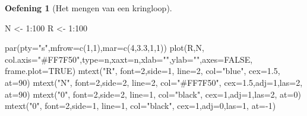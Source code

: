 \documentclass[
  a4paper,
]{scrbook}
\newenvironment{Shaded}{\begin{snugshade}}{\end{snugshade}}
\newcommand{\AttributeTok}[1]{\textcolor[rgb]{0.40,0.45,0.13}{#1}}
\newcommand{\ConstantTok}[1]{\textcolor[rgb]{0.56,0.35,0.01}{#1}}
\newcommand{\DecValTok}[1]{\textcolor[rgb]{0.68,0.00,0.00}{#1}}
\newcommand{\FloatTok}[1]{\textcolor[rgb]{0.68,0.00,0.00}{#1}}
\newcommand{\FunctionTok}[1]{\textcolor[rgb]{0.28,0.35,0.67}{#1}}
\newcommand{\NormalTok}[1]{\textcolor[rgb]{0.00,0.23,0.31}{#1}}
\newcommand{\OtherTok}[1]{\textcolor[rgb]{0.00,0.23,0.31}{#1}}
\newcommand{\SpecialCharTok}[1]{\textcolor[rgb]{0.37,0.37,0.37}{#1}}
\newcommand{\StringTok}[1]{\textcolor[rgb]{0.13,0.47,0.30}{#1}}
\theoremstyle{definition}
\newtheorem{exercise}{Oefening}[chapter]
\theoremstyle{remark}
\begin{document}
\begin{exercise}[Het mengen van een
kringloop]
\begin{Shaded}
\begin{Highlighting}[]
\NormalTok{N }\OtherTok{\textless{}{-}} \DecValTok{1}\SpecialCharTok{:}\DecValTok{100}
\NormalTok{R }\OtherTok{\textless{}{-}} \DecValTok{1}\SpecialCharTok{:}\DecValTok{100}

\FunctionTok{par}\NormalTok{(}\AttributeTok{pty=}\StringTok{"s"}\NormalTok{,}\AttributeTok{mfrow=}\FunctionTok{c}\NormalTok{(}\DecValTok{1}\NormalTok{,}\DecValTok{1}\NormalTok{),}\AttributeTok{mar=}\FunctionTok{c}\NormalTok{(}\DecValTok{4}\NormalTok{,}\FloatTok{3.3}\NormalTok{,}\DecValTok{1}\NormalTok{,}\DecValTok{1}\NormalTok{))}
\FunctionTok{plot}\NormalTok{(R,N,  }\AttributeTok{col.axis=}\StringTok{"\#FF7F50"}\NormalTok{,}\AttributeTok{type=}\StringTok{\textquotesingle{}n\textquotesingle{}}\NormalTok{,}\AttributeTok{xaxt=}\StringTok{\textquotesingle{}n\textquotesingle{}}\NormalTok{,}\AttributeTok{xlab=}\StringTok{""}\NormalTok{,}\AttributeTok{ylab=}\StringTok{""}\NormalTok{,}\AttributeTok{axes=}\ConstantTok{FALSE}\NormalTok{, }\AttributeTok{frame.plot=}\ConstantTok{TRUE}\NormalTok{)}
\FunctionTok{mtext}\NormalTok{(}\StringTok{"R"}\NormalTok{, }\AttributeTok{font=}\DecValTok{2}\NormalTok{,}\AttributeTok{side=}\DecValTok{1}\NormalTok{, }\AttributeTok{line=}\DecValTok{2}\NormalTok{, }\AttributeTok{col=}\StringTok{"blue"}\NormalTok{, }\AttributeTok{cex=}\FloatTok{1.5}\NormalTok{, }\AttributeTok{at=}\DecValTok{90}\NormalTok{)}
\FunctionTok{mtext}\NormalTok{(}\StringTok{"N"}\NormalTok{, }\AttributeTok{font=}\DecValTok{2}\NormalTok{,}\AttributeTok{side=}\DecValTok{2}\NormalTok{, }\AttributeTok{line=}\DecValTok{2}\NormalTok{, }\AttributeTok{col=}\StringTok{"\#FF7F50"}\NormalTok{, }\AttributeTok{cex=}\FloatTok{1.5}\NormalTok{,}\AttributeTok{adj=}\DecValTok{1}\NormalTok{,}\AttributeTok{las=}\DecValTok{2}\NormalTok{, }\AttributeTok{at=}\DecValTok{90}\NormalTok{)}
\FunctionTok{mtext}\NormalTok{(}\StringTok{"0"}\NormalTok{, }\AttributeTok{font=}\DecValTok{2}\NormalTok{,}\AttributeTok{side=}\DecValTok{2}\NormalTok{, }\AttributeTok{line=}\DecValTok{1}\NormalTok{, }\AttributeTok{col=}\StringTok{"black"}\NormalTok{, }\AttributeTok{cex=}\DecValTok{1}\NormalTok{,}\AttributeTok{adj=}\DecValTok{1}\NormalTok{,}\AttributeTok{las=}\DecValTok{2}\NormalTok{, }\AttributeTok{at=}\DecValTok{0}\NormalTok{)}
\FunctionTok{mtext}\NormalTok{(}\StringTok{"0"}\NormalTok{, }\AttributeTok{font=}\DecValTok{2}\NormalTok{,}\AttributeTok{side=}\DecValTok{1}\NormalTok{, }\AttributeTok{line=}\DecValTok{1}\NormalTok{, }\AttributeTok{col=}\StringTok{"black"}\NormalTok{, }\AttributeTok{cex=}\DecValTok{1}\NormalTok{,}\AttributeTok{adj=}\DecValTok{0}\NormalTok{,}\AttributeTok{las=}\DecValTok{1}\NormalTok{, }\AttributeTok{at=}\SpecialCharTok{{-}}\DecValTok{1}\NormalTok{)}

\end{Highlighting}
\end{Shaded}
\end{exercise}
\end{document}
